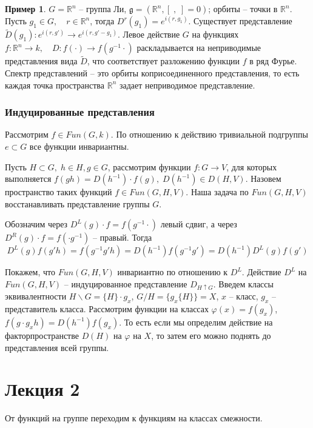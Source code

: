 \documentclass[a4paper,12pt]{article}
\theoremstyle{definition}
\theoremstyle{definition}
\theoremstyle{definition}
\theoremstyle{definition}
\newtheorem{example}{Пример}
\newcommand{\gf}{\mathfrak{g}}
\begin{document}
\begin{example}
  $G=\mathbb{R}^{n}$ -- группа Ли, $\gf=(\mathbb{R}^{n},[\;,\;]=0)$; орбиты -- точки в
  $\mathbb{R}^{n}$. Пусть $g_{1}\in G,\quad r\in \mathbb{R}^{n}$, тогда
  $D^{r}(g_{1})=e^{i(r,g_{1})}$. Существует представление $\tilde D(g_{1}): e^{i(r,g')}\to
  e^{i(r,g'-g_{1})}$. 
Левое действие $G$ на функциях $f:\mathbb{R}^{n}\to k,\quad D:f(\cdot)\to
  f(g^{-1}\cdot)$ раскладывается на неприводимые представления вида $\tilde D$, что соответствует
  разложению функции $f$ в ряд Фурье. Спектр представлений -- это орбиты коприсоединенного
  представления, то есть каждая точка пространства $\mathbb{R}^{n}$ задает неприводимое представление.
\end{example}

\subsubsection{Индуцированные представления}
\label{sec:induced-reps}

Рассмотрим $f\in Fun(G,k)$. По отношению к действию тривиальной подгруппы ${e}\subset G$ все функции
инвариантны.

Пусть $H\subset G,\; h\in H, g\in G$, рассмотрим функции $f:G\to V$, для которых выполняется
$f(gh)=D(h^{-1})\cdot f(g),\; D(h^{-1})\in D(H,V)$. Назовем пространство таких функций $f\in
Fun(G,H,V)$. Наша задача по $Fun(G,H,V)$ восстанавливать представление группы $G$. 

Обозначим через $D^{L}(g)\cdot f=f(g^{-1}\cdot)$ левый сдвиг, а через  $D^{R}(g)\cdot f=f(\cdot
g^{-1})$ -- правый. Тогда
\begin{equation}
  \label{eq:9}
  D^{L}(g)f(g'h)=f(g^{-1}g' h)=D(h^{-1}) f(g^{-1} g')=D(h^{-1})D^{L}(g)f(g')
\end{equation}

Покажем, что $Fun(G,H,V)$ инвариантно по отношению к $D^{L}$. Действие $D^{L}$ на $Fun(G,H,V)$ --
индуцированное представление $D_{H\uparrow G}$. Введем классы эквивалентности $H\backslash
G=\{H\}\cdot g_{x}$, $G/H=\{g_{x}\{H\}\}=X$, $x$ -- класс, $g_{x}$ -- представитель класса.
Рассмотрим функции на классах $\varphi(x)=f(g_{x})$, $f(g\cdot g_{x}h)=D(h^{-1})f(g_{x})$. То есть
если мы определим действие на факторпространстве $D(H)$ на $\varphi$ на $X$, то затем его можно
поднять до представления всей группы. 

\section{Лекция 2}
\label{sec:lecture-2}


От функций на группе переходим к функциям на классах смежности. 
\end{document}
